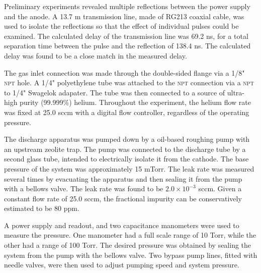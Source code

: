 Preliminary experiments revealed multiple reflections between the power supply
and the anode. A 13.7 m transmission line, made of RG213 coaxial cable, was used
to isolate the reflections so that the effect of individual pulses could be
examined. The calculated delay of the transmission line was 69.2 ns, for a total
separation time between the pulse and the reflection of 138.4 ns. The calculated
delay was found to be a close match in the measured delay.

The gas inlet connection was made through the double-sided flange via a 1/8"
\textsc{npt} hole. A 1/4" polyethylene tube was attached to the \textsc{npt}
connection via a \textsc{npt} to 1/4" Swagelok adapater. The tube was then
connected to a source of ultra-high purity (99.999\%) helium. Throughout the
experiment, the helium flow rate was fixed at 25.0 sccm with a digital flow
controller, regardless of the operating pressure.

The discharge apparatus was pumped down by a oil-based roughing pump with an
upstream zeolite trap. The pump was connected to the discharge tube by a second
glass tube, intended to electrically isolate it from the cathode. The base
pressure of the system was approximately 15 mTorr. The leak rate was measured
several times by evacuating the apparatus and then sealing it from the pump with
a bellows valve. The leak rate was found to be $2.0\times 10^{-3}$ sccm. Given a
constant flow rate of 25.0 sccm, the fractional impurity can be conservatively
estimated to be 80 ppm.

A   power supply and readout, and two capacitance
manometers were used to measure the pressure. One manometer had a full scale
range of 10 Torr, while the other had a range of 100 Torr. The desired pressure
was obtained by sealing the system from the pump with the bellows valve. Two
bypass pump lines, fitted with needle valves, were then used to adjust pumping
speed and system pressure.

